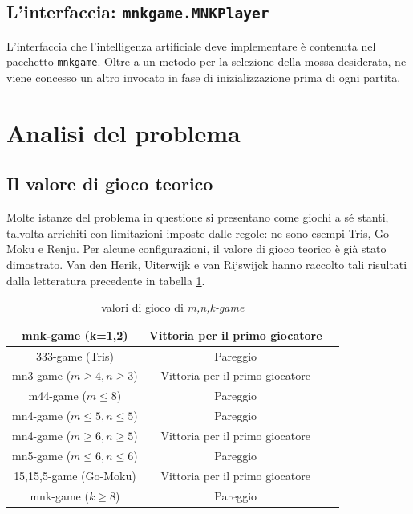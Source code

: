 \documentclass{article}
\begin{document}
\subsection{L'interfaccia: \texttt{mnkgame.MNKPlayer}}

L'interfaccia che l'intelligenza artificiale deve implementare è contenuta nel
pacchetto \verb!mnkgame!. Oltre a un metodo per la selezione della mossa
desiderata, ne viene concesso un altro invocato in fase di inizializzazione
prima di ogni partita.

\section{Analisi del problema}

\subsection{Il valore di gioco teorico}

Molte istanze del problema in questione si presentano come giochi a sé stanti,
talvolta arrichiti con limitazioni imposte dalle regole: ne sono esempi Tris,
Go-Moku e Renju. Per alcune configurazioni, il valore di gioco teorico è già
stato dimostrato. Van den Herik, Uiterwijk e van Rijswijck
\cite{VANDENHERIK2002277} hanno raccolto tali risultati dalla letteratura
precedente in tabella \ref{table:2}.

\begin{table}[h!]
  \centering
  \begin{tabular}{ | c | c | c | }
    \hline
    mnk-game (k=1,2) & Vittoria per il primo giocatore \\
    \hline
    333-game (Tris) & Pareggio \\
    \hline
    mn3-game ($m \geq 4, n \geq 3$) & Vittoria per il primo giocatore \\
    \hline
    m44-game ($m \leq 8$) & Pareggio \\
    \hline
    mn4-game ($m \leq 5,n \leq 5$) & Pareggio \\
    \hline
    mn4-game ($m \geq 6,n \geq 5$) & Vittoria per il primo giocatore \\
    \hline
    mn5-game ($m \leq 6,n \leq 6$) & Pareggio \\
    \hline
    15,15,5-game (Go-Moku) & Vittoria per il primo giocatore \\
    \hline
    mnk-game ($k \geq 8$) & Pareggio \\
    \hline
  \end{tabular}
    \caption{valori di gioco di \emph{m,n,k-game}}
    \label{table:2}
  \end{table}
\end{document}
